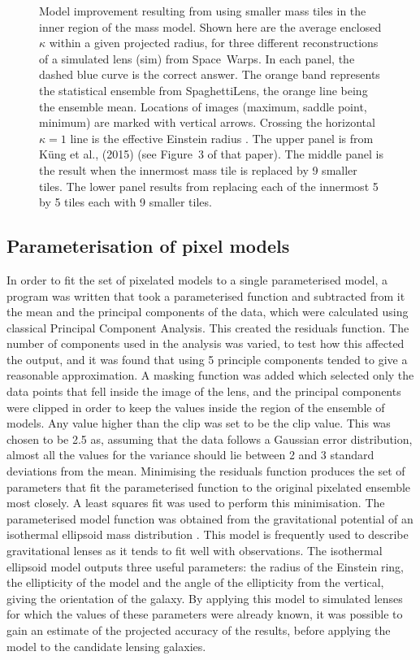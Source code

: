 \begin{figure}
  \caption{Model improvement resulting from using smaller mass tiles
    in the inner region of the mass model.  Shown here are the average
    enclosed $\kappa$ within a given projected radius, for three
    different reconstructions of a simulated lens (sim) from
    Space~Warps.  In each panel, the dashed blue curve is the correct
    answer.  The orange band represents the statistical ensemble from
    SpaghettiLens, the orange line being the ensemble mean.  Locations of
    images (maximum, saddle point, minimum) are marked with vertical
    arrows.  Crossing the horizontal $\kappa=1$ line is the effective
    Einstein radius \ER. The upper panel is from
    K\"ung et al., (2015) (see Figure~3 of that paper).  The middle
    panel is the result when the innermost mass tile is replaced by 9
    smaller tiles.  The lower panel results from replacing each of the
    innermost 5 by 5 tiles each with 9 smaller tiles.}
  \label{fig:subsampling}
\end{figure}

\subsection{Parameterisation of pixel models} \label{subsec:parameter}

In order to fit the set of pixelated models to a single parameterised model, a program was written that took a parameterised function and subtracted from it the mean and the principal components of the data, which were calculated using classical Principal Component Analysis.
This created the residuals function.
The number of components used in the analysis was varied, to test how this affected the output, and it was found that using 5 principle components tended to give a reasonable approximation.
A masking function was added which selected only the data points that fell inside the image of the lens, and the principal components were clipped in order to keep the values inside the region of the ensemble of models.
Any value higher than the clip was set to be the clip value.
This was chosen to be 2.5 as, assuming that the data follows a Gaussian error distribution, almost all the values for the variance should lie between 2 and 3 standard deviations from the mean.
Minimising the residuals function produces the set of parameters that fit the parameterised function to the original pixelated ensemble most closely.
A least squares fit was used to perform this minimisation.
The parameterised model function was obtained from the gravitational potential of an isothermal ellipsoid mass distribution \citep{2001astro.ph..2341K}.
This model is frequently used to describe gravitational lenses as it tends to fit well with observations.
The isothermal ellipsoid model outputs three useful parameters: the radius of the Einstein ring, the ellipticity of the model and the angle of the ellipticity from the vertical, giving the orientation of the galaxy.
By applying this model to simulated lenses for which the values of these parameters were already known, it was possible to gain an estimate of the projected accuracy of the results, before applying the model to the candidate lensing galaxies.

